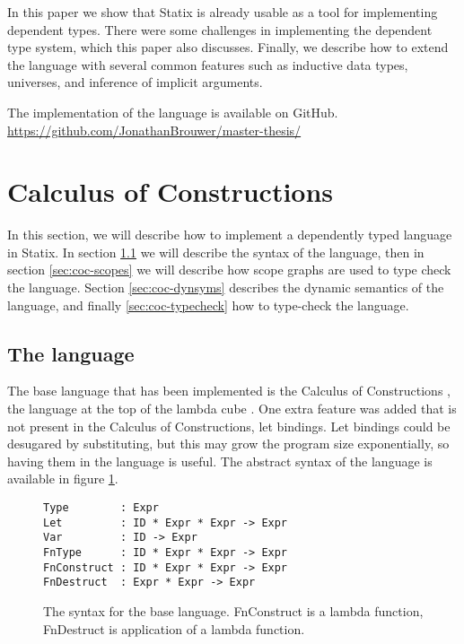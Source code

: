 \documentclass[a4paper,UKenglish,cleveref, autoref, thm-restate]{oasics-v2021}
\begin{document}
In this paper we show that Statix is already usable as a tool for implementing dependent types. There were some challenges in implementing the dependent type system, which this paper also discusses. Finally, we describe how to extend the language with several common features such as inductive data types, universes, and inference of implicit arguments.

The implementation of the language is available on GitHub.\\
\url{https://github.com/JonathanBrouwer/master-thesis/}

\section{Calculus of Constructions}

In this section, we will describe how to implement a dependently typed language in Statix. In section \ref{sec:coc-syntax} we will describe the syntax of the language, then in section \ref{sec:coc-scopes} we will describe how scope graphs are used to type check the language. Section \ref{sec:coc-dynsyms} describes the dynamic semantics of the language, and finally \ref{sec:coc-typecheck} how to type-check the language.

\subsection{The language}
\label{sec:coc-syntax}

The base language that has been implemented is the Calculus of Constructions \cite{Coquand_Huet_1988}, the language at the top of the lambda cube \cite{lambda_cube}. One extra feature was added that is not present in the Calculus of Constructions, let bindings. Let bindings could be desugared by substituting, but this may grow the program size exponentially, so having them in the language is useful. The abstract syntax of the language is available in figure \ref{fig:syntax}.

\begin{figure}[h]
\begin{lstlisting}
Type        : Expr
Let         : ID * Expr * Expr -> Expr
Var         : ID -> Expr
FnType      : ID * Expr * Expr -> Expr
FnConstruct : ID * Expr * Expr -> Expr
FnDestruct  : Expr * Expr -> Expr
\end{lstlisting}
\caption{The syntax for the base language. FnConstruct is a lambda function, FnDestruct is application of a lambda function.}
\label{fig:syntax}
\end{figure}
\end{document}
